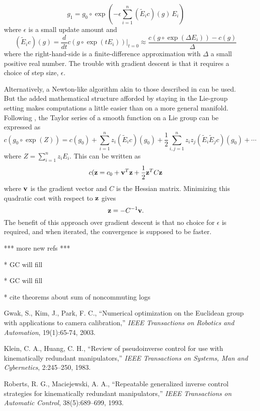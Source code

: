 \documentclass[twocolumn,10pt]{asme2ej}
\newcommand{\half}{\frac{1}{2}}
\begin{document}
\begin{equation}
g_1 = g_0 \circ \exp\left(-\epsilon \sum_{i=1}^{n} (\tilde{E}_i c)(g) \, E_i \right) 
\label{graddesc}
\end{equation}
where $\epsilon$ is a small update amount and 
$$ (\tilde{E}_i c)(g) = \frac{d}{dt} \left. c(g \circ \exp(t E_i)) \right|_{t=0} \approx \frac{c(g \circ \exp(\Delta E_i)) - c(g)}{\Delta} $$
where the right-hand-side is a finite-difference approximation with $\Delta$ a small positive real number.
The trouble with gradient descent is that it requires a choice of step size, $\epsilon$.

Alternatively, a Newton-like algorithm akin to those described in \cite{mahony} can be used. But the added mathematical structure
afforded by staying in the Lie-group setting makes computations a little easier than on a more general manifold. Following \cite{myvol2},
the Taylor series of a smooth function on a Lie group can be expressed as
$$ c(g_0 \circ \exp(Z)) = c(g_0) + \sum_{i=1}^{n} z_i (\tilde{E}_i c)(g_0) + \half \sum_{i,j=1}^{n} z_i z_j (\tilde{E}_i \tilde{E}_j c)(g_0) + \cdots $$
where $Z = \sum_{i=1}^{n} z_i E_i$. 
This can be written as
$$ c({\bf z} = c_0 + {\bf v}^T {\bf z} + \half {\bf z}^T C {\bf z} $$
where ${\bf v}$ is the gradient vector and $C$ is the Hessian matrix.
Minimizing this quadratic cost with respect to ${\bf z}$ gives
$$ {\bf z} = - C^{-1} {\bf v}. $$
The benefit of this approach over gradient descent is that no choice for $\epsilon$ is required, and when iterated, the convergence is 
supposed to be faster.

*** more new refs ***

\begin{thebibliography}{99}

* GC will fill

* GC will fill


* cite theorems about sum of noncommuting logs

Gwak, S., Kim, J., Park, F. C., ``Numerical optimization on the Euclidean group with applications to camera calibration,''
{\it IEEE Transactions on Robotics and Automation}, 19(1):65-74, 2003. 

Klein, C. A., Huang, C. H., ``Review of pseudoinverse control for use with kinematically redundant manipulators,''
{\it IEEE Transactions on Systems, Man and Cybernetics}, 2:245--250, 1983. 

Roberts, R. G., Maciejewski, A. A., ``Repeatable generalized inverse control strategies for kinematically redundant manipulators,''
{\it  IEEE Transactions on Automatic Control}, 38(5):689--699, 1993. 

\end{thebibliography}
\end{document}
